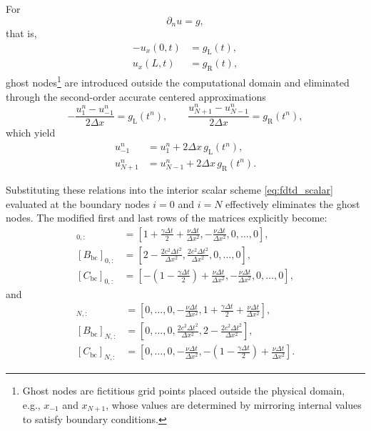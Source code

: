 \documentclass{Configuration_Files/PoliMi3i_thesis}
\newif\ifshowthesischanges
\DeclareRobustCommand{\thesischange}[2]{%
    \ifshowthesischanges
        \textcolor{#1}{#2}%
    \else
        #2%
    \fi
}
\def\thesischange#1#2{#2}%
\begin{document}
For
\begin{equation*}
\partial_n u=g,
\end{equation*}
that is,
\begin{align*}
-u_x(0,t)&=g_{\mathrm L}(t),
\\
u_x(L,t)&=g_{\mathrm R}(t),
\end{align*}
ghost nodes\footnote{\thesischange{red}{Ghost nodes are fictitious grid points placed outside the physical domain, e.g., $x_{-1}$ and $x_{N+1}$, whose values are determined by mirroring internal values to satisfy boundary conditions.}} are introduced outside the computational domain and eliminated through the second-order accurate centered approximations
\begin{equation*}
-\frac{u_{1}^n-u_{-1}^n}{2\Delta x}
=
g_{\mathrm L}(t^n),
\qquad
\frac{u_{N+1}^n-u_{N-1}^n}{2\Delta x}
=
g_{\mathrm R}(t^n),
\end{equation*}
which yield
\begin{align*}
u_{-1}^n
&=
u_1^n
+
2\Delta x\,g_{\mathrm L}(t^n),
\\
u_{N+1}^n
&=
u_{N-1}^n
+
2\Delta x\,g_{\mathrm R}(t^n).
\end{align*}

Substituting these relations into the interior scalar scheme \eqref{eq:fdtd_scalar} evaluated at the boundary nodes $i=0$ and $i=N$ effectively eliminates the ghost nodes. The modified first and last rows of the matrices explicitly become:
\begin{align*}
[A_{\mathrm{bc}}]_{0, :} &= \left[ 1+\frac{\gamma\Delta t}{2}+\frac{\nu\Delta t}{\Delta x^2}, -\frac{\nu\Delta t}{\Delta x^2}, 0, \dots, 0 \right], \\
[B_{\mathrm{bc}}]_{0, :} &= \left[ 2-\frac{2c^2\Delta t^2}{\Delta x^2}, \frac{2c^2\Delta t^2}{\Delta x^2}, 0, \dots, 0 \right], \\
[C_{\mathrm{bc}}]_{0, :} &= \left[ -\left(1-\frac{\gamma\Delta t}{2}\right) + \frac{\nu\Delta t}{\Delta x^2}, -\frac{\nu\Delta t}{\Delta x^2}, 0, \dots, 0 \right],
\end{align*}
and
\begin{align*}
[A_{\mathrm{bc}}]_{N, :} &= \left[ 0, \dots, 0, -\frac{\nu\Delta t}{\Delta x^2}, 1+\frac{\gamma\Delta t}{2}+\frac{\nu\Delta t}{\Delta x^2} \right], \\
[B_{\mathrm{bc}}]_{N, :} &= \left[ 0, \dots, 0, \frac{2c^2\Delta t^2}{\Delta x^2}, 2-\frac{2c^2\Delta t^2}{\Delta x^2} \right], \\
[C_{\mathrm{bc}}]_{N, :} &= \left[ 0, \dots, 0, -\frac{\nu\Delta t}{\Delta x^2}, -\left(1-\frac{\gamma\Delta t}{2}\right) + \frac{\nu\Delta t}{\Delta x^2} \right].
\end{align*}
\end{document}
